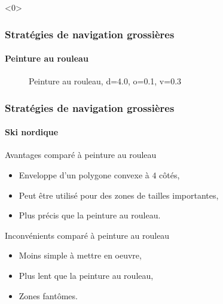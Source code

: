 \documentclass{beamer}
\begin{document}
				\begin{frame}<0>
					\frametitle{Stratégies de navigation grossières}
					\framesubtitle{Peinture au rouleau}
					\begin{figure}[H]
						\centering
						\caption{Peinture au rouleau, d=4.0, o=0.1, v=0.3}
					\end{figure}
				\end{frame}
				\begin{frame}
					\frametitle{Stratégies de navigation grossières}
					\framesubtitle{Ski nordique}
					\begin{exampleblock}{Avantages comparé à peinture au rouleau}
						\begin{itemize}
							\item Enveloppe d'un polygone convexe à $4$ côtés,
							\item Peut être utilisé pour des zones de tailles importantes,
							\item Plus précis que la peinture au rouleau.
						\end{itemize}
					\end{exampleblock}
					\begin{alertblock}{Inconvénients comparé à peinture au rouleau}
						\begin{itemize}
							\item Moins simple à mettre en oeuvre,
							\item Plus lent que la peinture au rouleau,
							\item Zones fantômes.
						\end{itemize}
					\end{alertblock}
				\end{frame}
\end{document}
